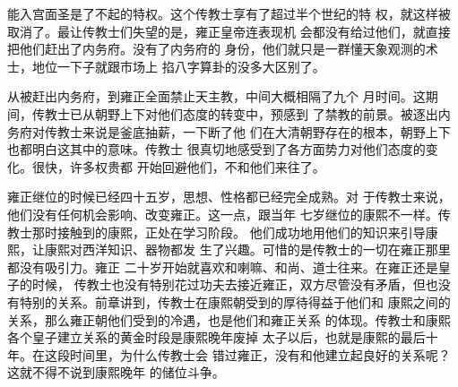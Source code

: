 能入宫面圣是了不起的特权。这个传教士享有了超过半个世纪的特%
权，就这样被取消了。最让传教士们失望的是，雍正皇帝连表现机%
会都没有给过他们，就直接把他们赶出了内务府。没有了内务府的%
身份，他们就只是一群懂天象观测的术士，地位一下子就跟市场上%
掐八字算卦的没多大区别了。%
\par
从被赶出内务府，到雍正全面禁止天主教，中间大概相隔了九个%
月时间。这期间，传教士已从朝野上下对他们态度的转变中，预感到%
了禁教的前景。被逐出内务府对传教士来说是釜底抽薪，一下断了他%
们在大清朝野存在的根本，朝野上下也都明白这其中的意味。传教士%
很真切地感受到了各方面势力对他们态度的变化。很快，许多权贵都%
开始回避他们，不和他们来往了。%
\par
雍正继位的时候已经四十五岁，思想、性格都已经完全成熟。对%
于传教士来说，他们没有任何机会影响、改变雍正。这一点，跟当年%
七岁继位的康熙不一样。传教士那时接触到的康熙，正处在学习阶段。%
他们成功地用他们的知识来引导康熙，让康熙对西洋知识、器物都发%
生了兴趣。可惜的是传教士的一切在雍正那里都没有吸引力。雍正%
二十岁开始就喜欢和喇嘛、和尚、道士往来。在雍正还是皇子的时候，%
传教士也没有特别花过功夫去接近雍正，双方尽管没有矛盾，但也没%
有特别的关系。前章讲到，传教士在康熙朝受到的厚待得益于他们和%
康熙之间的关系，那么雍正朝他们受到的冷遇，也是他们和雍正关系%
的体现。传教士和康熙各个皇子建立关系的黄金时段是康熙晚年废掉%
太子以后，也就是康熙的最后十年。在这段时间里，为什么传教士会%
错过雍正，没有和他建立起良好的关系呢？这就不得不说到康熙晚年%
的储位斗争。%

